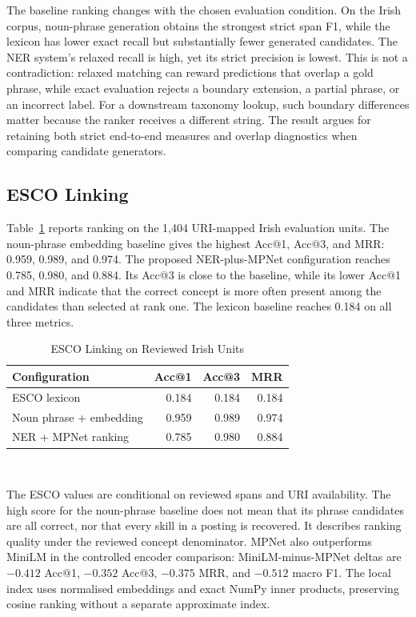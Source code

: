\documentclass[conference]{IEEEtran}
\begin{document}
The baseline ranking changes with the chosen evaluation condition. On the Irish corpus, noun-phrase generation obtains the strongest strict span F1, while the lexicon has lower exact recall but substantially fewer generated candidates. The NER system's relaxed recall is high, yet its strict precision is lowest. This is not a contradiction: relaxed matching can reward predictions that overlap a gold phrase, while exact evaluation rejects a boundary extension, a partial phrase, or an incorrect label. For a downstream taxonomy lookup, such boundary differences matter because the ranker receives a different string. The result argues for retaining both strict end-to-end measures and overlap diagnostics when comparing candidate generators.

\subsection{ESCO Linking}
Table~\ref{tab:esco} reports ranking on the 1,404 URI-mapped Irish evaluation units. The noun-phrase embedding baseline gives the highest Acc@1, Acc@3, and MRR: 0.959, 0.989, and 0.974. The proposed NER-plus-MPNet configuration reaches 0.785, 0.980, and 0.884. Its Acc@3 is close to the baseline, while its lower Acc@1 and MRR indicate that the correct concept is more often present among the candidates than selected at rank one. The lexicon baseline reaches 0.184 on all three metrics.

\begin{table}[!t]
\caption{ESCO Linking on Reviewed Irish Units}
\label{tab:esco}
\centering
\small
\begin{tabular}{lrrr}
\toprule
Configuration & Acc@1 & Acc@3 & MRR \\
\midrule
ESCO lexicon & 0.184 & 0.184 & 0.184 \\
Noun phrase + embedding & 0.959 & 0.989 & 0.974 \\
NER + MPNet ranking & 0.785 & 0.980 & 0.884 \\
\bottomrule
\end{tabular}
\\[1mm]
\par{}
\end{table}

The ESCO values are conditional on reviewed spans and URI availability. The high score for the noun-phrase baseline does not mean that its phrase candidates are all correct, nor that every skill in a posting is recovered. It describes ranking quality under the reviewed concept denominator. MPNet also outperforms MiniLM in the controlled encoder comparison: MiniLM-minus-MPNet deltas are $-0.412$ Acc@1, $-0.352$ Acc@3, $-0.375$ MRR, and $-0.512$ macro F1. The local index uses normalised embeddings and exact NumPy inner products, preserving cosine ranking without a separate approximate index.
\end{document}
